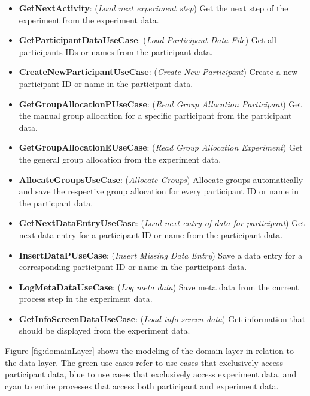 \begin{itemize}
    \item \textbf{GetNextActivity}: (\textit{Load next experiment step}) Get the next step of the experiment from the experiment data.
    \item \textbf{GetParticipantDataUseCase}: (\textit{Load Participant Data File}) Get all participants IDs or names from the participant data. 
    \item \textbf{CreateNewParticipantUseCase}: (\textit{Create New Participant}) Create a new participant ID or name in the participant data.
    \item \textbf{GetGroupAllocationPUseCase}: (\textit{Read Group Allocation Participant}) Get the manual group allocation for a specific participant from the participant data.
    \item \textbf{GetGroupAllocationEUseCase}: (\textit{Read Group Allocation Experiment}) Get the general group allocation from the experiment data.
    \item \textbf{AllocateGroupsUseCase}: (\textit{Allocate Groups}) Allocate groups automatically and save the respective group allocation for every participant ID or name in the particpant data. 
    \item \textbf{GetNextDataEntryUseCase}: (\textit{Load next entry of data for participant}) Get next data entry for a participant ID or name from the participant data. 
    \item \textbf{InsertDataPUseCase}: (\textit{Insert Missing Data Entry}) Save a data entry for a corresponding participant ID or name in the participant data.
    \item \textbf{LogMetaDataUseCase}: (\textit{Log meta data}) Save meta data from the current process step in the experiment data.
    \item \textbf{GetInfoScreenDataUseCase}: (\textit{Load info screen data}) Get information that should be displayed from the experiment data.  
\end{itemize}

Figure \ref{fig:domainLayer} shows the modeling of the domain layer in relation to the data layer. The green use cases refer to use cases that exclusively access participant data, blue to use cases that exclusively access experiment data, and cyan to entire processes that access both participant and experiment data.

